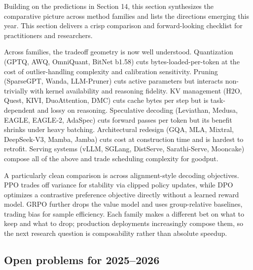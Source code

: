 Building on the predictions in Section 14, this section synthesizes the comparative picture across method families and lists the directions emerging this year. This section delivers a crisp comparison and forward-looking checklist for practitioners and researchers.

Across families, the tradeoff geometry is now well understood. Quantization (GPTQ, AWQ, OmniQuant, BitNet b1.58) cuts bytes-loaded-per-token at the cost of outlier-handling complexity and calibration sensitivity. Pruning (SparseGPT, Wanda, LLM-Pruner) cuts active parameters but interacts non-trivially with kernel availability and reasoning fidelity. KV management (H2O, Quest, KIVI, DuoAttention, DMC) cuts cache bytes per step but is task-dependent and lossy on reasoning. Speculative decoding (Leviathan, Medusa, EAGLE, EAGLE-2, AdaSpec) cuts forward passes per token but its benefit shrinks under heavy batching. Architectural redesign (GQA, MLA, Mixtral, DeepSeek-V3, Mamba, Jamba) cuts cost at construction time and is hardest to retrofit. Serving systems (vLLM, SGLang, DistServe, Sarathi-Serve, Mooncake) compose all of the above and trade scheduling complexity for goodput.

A particularly clean comparison is across alignment-style decoding objectives. PPO trades off variance for stability via clipped policy updates, while DPO optimizes a contrastive preference objective directly without a learned reward model. GRPO further drops the value model and uses group-relative baselines, trading bias for sample efficiency. Each family makes a different bet on what to keep and what to drop; production deployments increasingly compose them, so the next research question is composability rather than absolute speedup.

\subsection{Open problems for 2025--2026}\label{open-problems-for-20252026}

